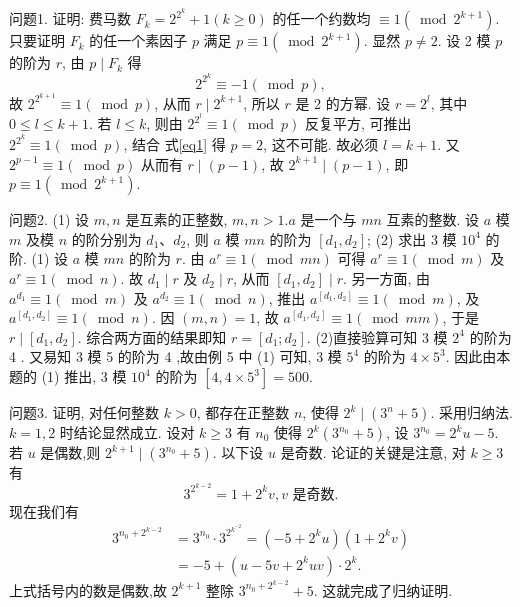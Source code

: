 
问题1. 证明: 费马数 $F_k=2^{2^k}+1(k \geqslant 0)$ 的任一个约数均 $\equiv 1\left(\bmod 2^{k+1}\right)$.
只要证明 $F_k$ 的任一个素因子 $p$ 满足 $p \equiv 1\left(\bmod 2^{k+1}\right)$. 显然 $p \neq 2$. 设 2 模 $p$ 的阶为 $r$, 由 $p \mid F_k$ 得
$$
2^{2^k} \equiv-1(\bmod p), \label{eq1}
$$
故 $2^{2^{k+1}} \equiv 1(\bmod p)$, 从而 $r \mid 2^{k+1}$, 所以 $r$ 是 2 的方幂.
设 $r=2^l$, 其中 $0 \leqslant l \leqslant k+1$. 若 $l \leqslant k$, 则由 $2^{2^l} \equiv 1(\bmod p)$ 反复平方, 可推出 $2^{2^k} \equiv 1(\bmod p)$, 结合 式\ref{eq1} 得 $p=2$, 这不可能.
故必须 $l=k+1$. 又 $2^{p-1} \equiv 1(\bmod p)$ 从而有 $r \mid(p- 1)$, 故 $2^{k+1} \mid(p-1)$, 即 $p \equiv 1\left(\bmod 2^{k+1}\right)$.



问题2. (1) 设 $m, n$ 是互素的正整数, $m, n>1 . a$ 是一个与 $m n$ 互素的整数.
设 $a$ 模 $m$ 及模 $n$ 的阶分别为 $d_1 、 d_2$, 则 $a$ 模 $m n$ 的阶为 $\left[d_1, d_2\right]$;
(2) 求出 3 模 $10^4$ 的阶.
(1) 设 $a$ 模 $m n$ 的阶为 $r$. 由 $a^r \equiv 1(\bmod m n)$ 可得 $a^r \equiv 1(\bmod m)$ 及 $a^r \equiv 1(\bmod n)$. 故 $d_1 \mid r$ 及 $d_2 \mid r$, 从而 $\left[d_1, d_2\right] \mid r$. 另一方面, 由 $a^{d_1} \equiv 1(\bmod m)$ 及 $a^{d_2} \equiv 1(\bmod n)$, 推出 $a^{\left[d_1, d_2\right]} \equiv 1(\bmod m)$, 及 $a^{\left[d_1, d_2\right]} \equiv 1(\bmod n)$. 因 $(m, n)=1$, 故 $a^{\left[d_1, d_2\right]} \equiv 1(\bmod m m)$, 于是 $r \mid\left[d_1, d_2\right]$. 综合两方面的结果即知 $r=\left[d_1 ; d_2\right]$.
(2)直接验算可知 3 模 $2^4$ 的阶为 4 . 又易知 3 模 5 的阶为 4 ,故由例 5 中 (1) 可知, 3 模 $5^4$ 的阶为 $4 \times 5^3$. 因此由本题的 (1) 推出, 3 模 $10^4$ 的阶为 $[4,4 \times 5^3]=500$.



问题3. 证明, 对任何整数 $k>0$, 都存在正整数 $n$, 使得 $2^k \mid\left(3^n+5\right)$.
采用归纳法.
$k=1,2$ 时结论显然成立.
设对 $k \geqslant 3$ 有 $n_0$ 使得 $2^k \left(3^{n_0}+5\right)$, 设 $3^{n_0}=2^k u-5$. 若 $u$ 是偶数,则 $2^{k+1} \mid\left(3^{n_0}+5\right)$. 以下设 $u$ 是奇数.
论证的关键是注意, 对 $k \geqslant 3$ 有
$$
3^{2^{k-2}}=1+2^k v, v \text { 是奇数.
}
$$
现在我们有
$$
\begin{aligned}
3^{n_0+2^{k-2}} & =3^{n_0} \cdot 3^{2^{k^{-2}}}=\left(-5+2^k u\right)\left(1+2^k v\right) \\
& =-5+\left(u-5 v+2^k u v\right) \cdot 2^k .
\end{aligned}
$$
上式括号内的数是偶数,故 $2^{k+1}$ 整除 $3^{n_0+2^{k-2}}+5$. 这就完成了归纳证明.



